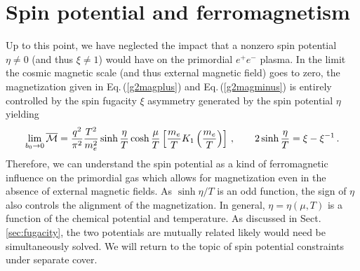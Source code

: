 \documentclass[a4paper]{article}
\newcommand{\req}[1]{Eq.\,(\ref{#1})}
\newcommand{\rsec}[1]{Sect.\,{\ref{#1}}}
\begin{document}
\section{Spin potential and ferromagnetism}
\label{sec:spin}
\noindent Up to this point, we have neglected the impact that a nonzero spin potential $\eta\neq0$ (and thus $\xi\neq1$) would have on the primordial $e^{+}e^{-}$ plasma. In the limit the cosmic magnetic scale (and thus external magnetic field) goes to zero, the magnetization given in \req{g2magplus} and \req{g2magminus} is entirely controlled by the spin fugacity $\xi$ asymmetry generated by the spin potential $\eta$ yielding
\begin{align}
    \lim_{b_{0}\rightarrow0}{\overline{\cal M}}=\frac{q^{2}}{\pi^{2}}\frac{T^{2}}{m_{e}^{2}}\sinh{\frac{\eta}{T}}\cosh{\frac{\mu}{T}}\left[\frac{m_{e}}{T}K_{1}\left(\frac{m_{e}}{T}\right)\right]\,,\qquad2\sinh{\frac{\eta}{T}}=\xi-\xi^{-1}\,.
\end{align}
Therefore, we can understand the spin potential as a kind of ferromagnetic influence on the primordial gas which allows for magnetization even in the absence of external magnetic fields. As $\sinh{\eta/T}$ is an odd function, the sign of $\eta$ also controls the alignment of the magnetization. In general, $\eta=\eta(\mu,T)$ is a function of the chemical potential and temperature. As discussed in \rsec{sec:fugacity}, the two potentials are mutually related likely would need be simultaneously solved. We will return to the topic of spin potential constraints under separate cover.
\end{document}

